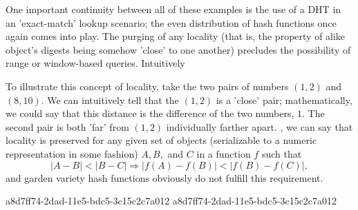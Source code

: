 \documentclass[12pt]{article}
\begin{document}
\par One important continuity between all of these examples is the use of a DHT in an 'exact-match' lookup scenario; the even distribution of hash functions once again comes into play. The purging of any locality (that is, the property of alike object's digests being somehow 'close' to one another) precludes the possibility of range or window-based queries. Intuitively

\par To illustrate this concept of locality, take the two pairs of numbers $(1,2)$ and $(8,10)$. We can intuitively tell that the $(1,2)$ is a 'close' pair; mathematically, we could say that this distance is the difference of the two numbers, $1$. The second pair is both 'far' from $(1,2)$ individually farther apart. , we can say that locality is preserved for any given set of objects (serializable to a numeric representation in some fashion) $A,B,$ and $C$ in a function $f$ such that
\begin{equation}
|A-B| < |B-C| \Rightarrow |f(A)-f(B)| < |f(B) - f(C)|,
\end{equation}
and garden variety hash functions obviously do not fulfill this requirement.

a8d7ff74-2dad-11e5-bdc5-3c15c2c7a012\printbibliography
a8d7ff74-2dad-11e5-bdc5-3c15c2c7a012
\end{document}
